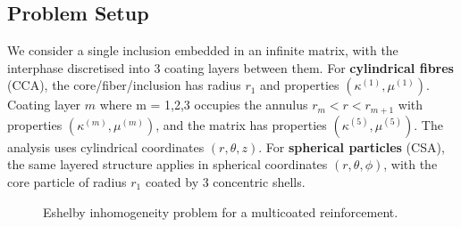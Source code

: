 \documentclass[oneside, 12pt, a4paper, bibliography=totoc]{book}
\newcommand{\bs}[1]{\bm{#1}}                       %
\begin{document}
\subsection{Problem Setup}
\label{subsec:interphase_problem_setup}

We consider a single inclusion embedded in an infinite matrix, with the interphase discretised into 3 coating layers between them. For \textbf{cylindrical fibres} (CCA), the core/fiber/inclusion has radius $r_1$ and properties $(\kappa^{(1)}, \mu^{(1)})$. Coating layer $m$ where m = 1,2,3 occupies the annulus $r_m < r < r_{m+1}$ with properties $(\kappa^{(m)}, \mu^{(m)})$, and the matrix has properties $(\kappa^{(5)}, \mu^{(5)})$. The analysis uses cylindrical coordinates $(r, \theta, z)$. For \textbf{spherical particles} (CSA), the same layered structure applies in spherical coordinates $(r, \theta, \phi)$, with the core particle of radius $r_1$ coated by 3 concentric shells.


\begin{figure}[htbp]
\centering
{}
\caption{Eshelby inhomogeneity problem for a multicoated reinforcement.}
\label{fig:eshelby_multicoated}
\end{figure}
\end{document}
